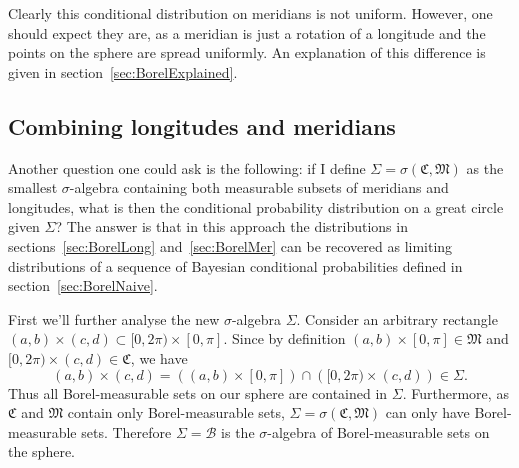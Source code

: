 \documentclass[twoside,a4paper]{report}
\theoremstyle{plain}
\theoremstyle{definition}
\theoremstyle{remark}
\numberwithin{equation}{chapter}
\DeclareMathOperator{\1}{\mathbbm{1}}
\newcommand{\B}{\mathcal{B}}
\begin{document}
Clearly this conditional distribution on meridians is not uniform. However, one should expect they are, as a meridian is just a rotation of a longitude and the points on the sphere are spread uniformly. An explanation of this difference is given in section~\ref{sec:BorelExplained}.

\subsection{Combining longitudes and meridians}
Another question one could ask is the following: if I define $\Sigma=\sigma(\mathfrak{C},\mathfrak{M})$ as the smallest $\sigma$-algebra containing both measurable subsets of meridians and longitudes, what is then the conditional probability distribution on a great circle given $\Sigma$? The answer is that in this approach the distributions in sections~\ref{sec:BorelLong} and~\ref{sec:BorelMer} can be recovered as limiting distributions of a sequence of Bayesian conditional probabilities defined in section~\ref{sec:BorelNaive}.

First we'll further analyse the new $\sigma$-algebra $\Sigma$. Consider an arbitrary rectangle $(a,b)\times(c,d)\subset[0,2\pi)\times[0,\pi]$. Since by definition $(a,b)\times[0,\pi]\in\mathfrak{M}$ and $[0,2\pi)\times(c,d)\in\mathfrak{C}$, we have
\begin{equation}
(a,b)\times(c,d)=\left((a,b)\times[0,\pi]\right)\cap\left([0,2\pi)\times(c,d)\right)\in\Sigma.
\end{equation}
Thus all Borel-measurable sets on our sphere are contained in $\Sigma$. Furthermore, as $\mathfrak{C}$ and $\mathfrak{M}$ contain only Borel-measurable sets, $\Sigma=\sigma(\mathfrak{C},\mathfrak{M})$ can only have Borel-measurable sets. Therefore $\Sigma=\B$ is the $\sigma$-algebra of Borel-measurable sets on the sphere.
\end{document}
